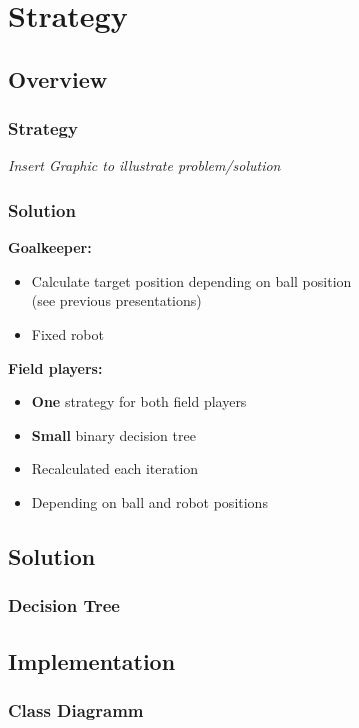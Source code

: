 \documentclass[hyperref={pdfpagelabels=false}]{beamer}
\begin{document}
\section{Strategy}
\subsection{Overview}
\begin{frame}
    \frametitle{Strategy}
    \textit{Insert Graphic to illustrate problem/solution}
\end{frame}

\begin{frame}
    \frametitle{Solution}
    \textbf{Goalkeeper:}\\
    \begin{itemize}
        \item Calculate target position depending on ball position\\
        (see previous presentations)
        \item Fixed robot
    \end{itemize}
    
    \textbf{Field players:}\\
    \begin{itemize}
        \item \textbf{One} strategy for both field players
        \item \textbf{Small} binary decision tree
        \item Recalculated each iteration
        \item Depending on ball and robot positions
    \end{itemize}

\end{frame}

\subsection{Solution}
\begin{frame}
    \frametitle{Decision Tree}
    \begin{center}
        
    \end{center}
\end{frame}

\subsection{Implementation}
\begin{frame}
    \frametitle{Class Diagramm}
    \begin{center}
        
    \end{center}
\end{frame}
\end{document}
